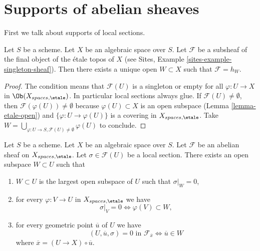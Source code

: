 \section{Supports of abelian sheaves}
\label{section-support}

\noindent
First we talk about supports of local sections.

\begin{lemma}
\label{lemma-support-subsheaf-final}
Let $S$ be a scheme. Let $X$ be an algebraic space over $S$.
Let $\mathcal{F}$ be a subsheaf of the final object of the \'etale
topos of $X$ (see
Sites, Example \ref{sites-example-singleton-sheaf}).
Then there exists a unique open
$W \subset X$ such that $\mathcal{F} = h_W$.
\end{lemma}

\begin{proof}
The condition means that $\mathcal{F}(U)$ is a singleton or
empty for all $\varphi : U \to X$ in $\Ob(X_{spaces, \etale})$.
In particular local sections always glue. If
$\mathcal{F}(U) \not = \emptyset$, then
$\mathcal{F}(\varphi(U)) \not = \emptyset$ because
$\varphi(U) \subset X$ is an open subspace
(Lemma \ref{lemma-etale-open})
and
$\{\varphi : U \to \varphi(U)\}$ is a covering in $X_{spaces, \etale}$.
Take
$W = \bigcup_{\varphi : U \to S, \mathcal{F}(U) \not = \emptyset} \varphi(U)$
to conclude.
\end{proof}

\begin{lemma}
\label{lemma-zero-over-image}
Let $S$ be a scheme.
Let $X$ be an algebraic space over $S$.
Let $\mathcal{F}$ be an abelian sheaf on $X_{spaces, \etale}$.
Let $\sigma \in \mathcal{F}(U)$ be a local section.
There exists an open subspace $W \subset U$ such that
\begin{enumerate}
\item $W \subset U$ is the largest open subspace of $U$ such
that $\sigma|_W = 0$,
\item for every $\varphi : V \to U$ in $X_{spaces, \etale}$ we have
$$
\sigma|_V = 0 \Leftrightarrow \varphi(V) \subset W,
$$
\item for every geometric point $\overline{u}$ of $U$ we have
$$
(U, \overline{u}, \sigma) = 0\text{ in }\mathcal{F}_{\overline{x}}
\Leftrightarrow
\overline{u} \in W
$$
where $\overline{x} = (U \to X) \circ \overline{u}$.
\end{enumerate}
\end{lemma}

